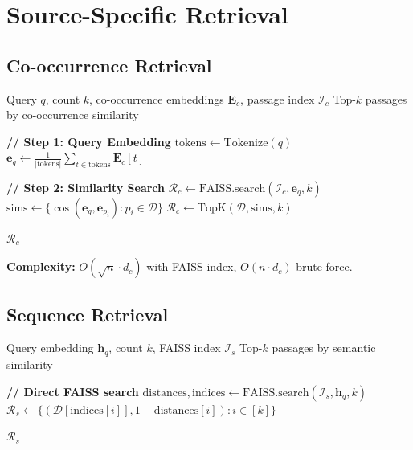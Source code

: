 \documentclass[11pt]{article}
\begin{document}
\section{Source-Specific Retrieval}

\subsection{Co-occurrence Retrieval}

\begin{algorithm}[H]
\caption{CooccurrenceRetrieval}
\label{alg:cooc}
\begin{algorithmic}[1]
\REQUIRE Query $q$, count $k$, co-occurrence embeddings $\mathbf{E}_c$, passage index $\mathcal{I}_c$
\ENSURE Top-$k$ passages by co-occurrence similarity

\STATE \textbf{// Step 1: Query Embedding}
\STATE $\text{tokens} \leftarrow \text{Tokenize}(q)$
\STATE $\mathbf{e}_q \leftarrow \frac{1}{|\text{tokens}|} \sum_{t \in \text{tokens}} \mathbf{E}_c[t]$ 

\STATE
\STATE \textbf{// Step 2: Similarity Search}
    \STATE $\mathcal{R}_c \leftarrow \text{FAISS.search}(\mathcal{I}_c, \mathbf{e}_q, k)$
\ELSE
    \STATE $\text{sims} \leftarrow \{\cos(\mathbf{e}_q, \mathbf{e}_{p_i}) : p_i \in \mathcal{D}\}$ 
    \STATE $\mathcal{R}_c \leftarrow \text{TopK}(\mathcal{D}, \text{sims}, k)$
\ENDIF

\RETURN $\mathcal{R}_c$
\end{algorithmic}
\end{algorithm}

\textbf{Complexity:} $O(\sqrt{n} \cdot d_c)$ with FAISS index, $O(n \cdot d_c)$ brute force.

\subsection{Sequence Retrieval}

\begin{algorithm}[H]
\caption{SequenceRetrieval}
\label{alg:seq}
\begin{algorithmic}[1]
\REQUIRE Query embedding $\mathbf{h}_q$, count $k$, FAISS index $\mathcal{I}_s$
\ENSURE Top-$k$ passages by semantic similarity

\STATE \textbf{// Direct FAISS search}
\STATE $\text{distances}, \text{indices} \leftarrow \text{FAISS.search}(\mathcal{I}_s, \mathbf{h}_q, k)$
\STATE $\mathcal{R}_s \leftarrow \{(\mathcal{D}[\text{indices}[i]], 1 - \text{distances}[i]) : i \in [k]\}$

\RETURN $\mathcal{R}_s$
\end{algorithmic}
\end{algorithm}
\end{document}
